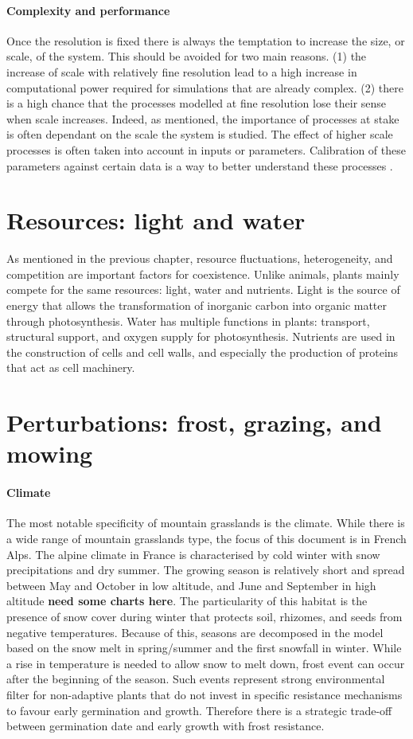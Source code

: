 \paragraph{Complexity and performance}
Once the resolution is fixed there is always the temptation to increase the size, or scale, of the system. This should be avoided for two main reasons. (1) the increase of scale with relatively fine resolution lead to a high increase in computational power required for simulations that are already complex. (2) there is a high chance that the processes modelled at fine resolution lose their sense when scale increases. Indeed, as mentioned, the importance of processes at stake is often dependant on the scale the system is studied. The effect of higher scale processes is often taken into account in inputs or parameters. Calibration of these parameters against certain data is a way to better understand these processes \parencite{lagarrigues_approximate_2015}. 

\section{Resources: light and water}
As mentioned in the previous chapter, resource fluctuations, heterogeneity, and competition are important factors for coexistence. Unlike animals, plants mainly compete for the same resources: light, water and nutrients. Light is the source of energy that allows the transformation of inorganic carbon into organic matter through photosynthesis. Water has multiple functions in plants: transport, structural support, and oxygen supply for photosynthesis. Nutrients are used in the construction of cells and cell walls, and especially the production of proteins that act as cell machinery.

\section{Perturbations: frost, grazing, and mowing}
\paragraph{Climate}
The most notable specificity of mountain grasslands is the climate. While there is a wide range of mountain grasslands type, the focus of this document is in French Alps. The alpine climate in France is characterised by cold winter with snow precipitations and dry summer. The growing season is relatively short and spread between May and October in low altitude, and June and September in high altitude \textbf{need some charts here}. The particularity of this habitat is the presence of snow cover during winter that protects soil, rhizomes, and seeds from negative temperatures. Because of this, seasons are decomposed in the model based on the snow melt in spring/summer and the first snowfall in winter. While a rise in temperature is needed to allow snow to melt down, frost event can occur after the beginning of the season. Such events represent strong environmental filter for non-adaptive plants that do not invest in specific resistance mechanisms to favour early germination and growth. Therefore there is a strategic trade-off between germination date and early growth with frost resistance.

